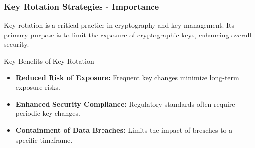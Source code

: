 \documentclass{beamer}
\begin{document}
\begin{frame}[fragile]
    \frametitle{Key Rotation Strategies - Importance}
    Key rotation is a critical practice in cryptography and key management. 
    Its primary purpose is to limit the exposure of cryptographic keys, enhancing overall security. 

    \begin{block}{Key Benefits of Key Rotation}
        \begin{itemize}
            \item \textbf{Reduced Risk of Exposure:} Frequent key changes minimize long-term exposure risks.
            \item \textbf{Enhanced Security Compliance:} Regulatory standards often require periodic key changes.
            \item \textbf{Containment of Data Breaches:} Limits the impact of breaches to a specific timeframe.
        \end{itemize}
    \end{block}
\end{frame}
\end{document}
